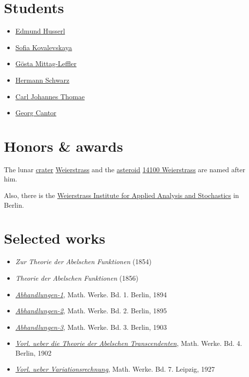 \documentclass{book}
\numberwithin{equation}{section}
\begin{document}
\section{Students}
\begin{itemize}
    \item \href{https://en.wikipedia.org/wiki/Edmund_Husserl}{Edmund Husserl}
    \item \href{https://en.wikipedia.org/wiki/Sofia_Kovalevskaya}{Sofia Kovalevskaya}
    \item \href{https://en.wikipedia.org/wiki/G%C3%B6sta_Mittag-Leffler}{Gösta Mittag-Leffler}
    \item \href{https://en.wikipedia.org/wiki/Hermann_Schwarz}{Hermann Schwarz}
    \item \href{https://en.wikipedia.org/wiki/Carl_Johannes_Thomae}{Carl Johannes Thomae}
    \item \href{https://en.wikipedia.org/wiki/Georg_Cantor}{Georg Cantor}
\end{itemize}

\section{Honors \& awards}
The lunar \href{https://en.wikipedia.org/wiki/Impact_crater}{crater} \href{https://en.wikipedia.org/wiki/Weierstrass_(crater)}{Weierstrass} and the \href{https://en.wikipedia.org/wiki/Asteroid}{asteroid} \href{https://en.wikipedia.org/wiki/14100_Weierstrass}{14100 Weierstrass} are named after him.

Also, there is the \href{https://en.wikipedia.org/wiki/Weierstrass_Institute_for_Applied_Analysis_and_Stochastics}{Weierstrass Institute for Applied Analysis and Stochastics} in Berlin.

\section{Selected works}
\begin{itemize}
    \item \textit{Zur Theorie der Abelschen Funktionen} (1854)
    \item \textit{Theorie der Abelschen Funktionen} (1856)
    \item \href{http://name.umdl.umich.edu/AAN8481.0001.001}{\textit{Abhandlungen-1}}, Math. Werke. Bd. 1. Berlin, 1894
    \item \href{http://name.umdl.umich.edu/AAN8481.0002.001}{\textit{Abhandlungen-2}}, Math. Werke. Bd. 2. Berlin, 1895
    \item \href{http://name.umdl.umich.edu/AAN8481.0003.001}{\textit{Abhandlungen-3}}, Math. Werke. Bd. 3. Berlin, 1903
    \item \href{http://name.umdl.umich.edu/AAN8481.0004.001}{\textit{Vorl. ueber die Theorie der Abelschen Transcendenten}}, Math. Werke. Bd. 4. Berlin, 1902
    \item \href{http://name.umdl.umich.edu/AAN8481.0007.001}{\textit{Vorl. ueber Variationsrechnung}}, Math. Werke. Bd. 7. Leipzig, 1927
\end{itemize}
\end{document}
